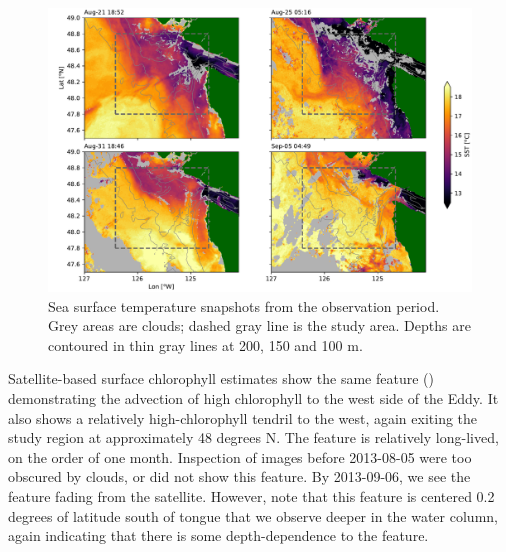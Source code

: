 \documentclass[draft]{agujournal2019}
\newcommand*{\Eddy}{{\sc Eddy}}
\begin{document}
\begin{figure}
  \begin{center}
    \includegraphics[width=6in]{SSTSnaps}
    \caption{Sea surface temperature snapshots from the observation period.  Grey areas are clouds; dashed gray line is the study area. Depths are contoured in thin gray lines at 200, 150 and 100 m. \cite{L2PMetopA}\label{fig:SST}}
  \end{center}
\end{figure}

Satellite-based surface chlorophyll estimates show the same feature () demonstrating the advection of high chlorophyll to the west side of the \Eddy. It also shows a relatively high-chlorophyll tendril to the west, again exiting the study region at approximately 48 degrees N.  The feature is relatively long-lived, on the order of one month.  Inspection of images before 2013-08-05 were too obscured by clouds, or did not show this feature.  By 2013-09-06, we see the feature fading from the satellite.  However, note that this feature is centered 0.2 degrees of latitude south of tongue that we observe deeper in the water column, again indicating that there is some depth-dependence to the feature.
\end{document}
